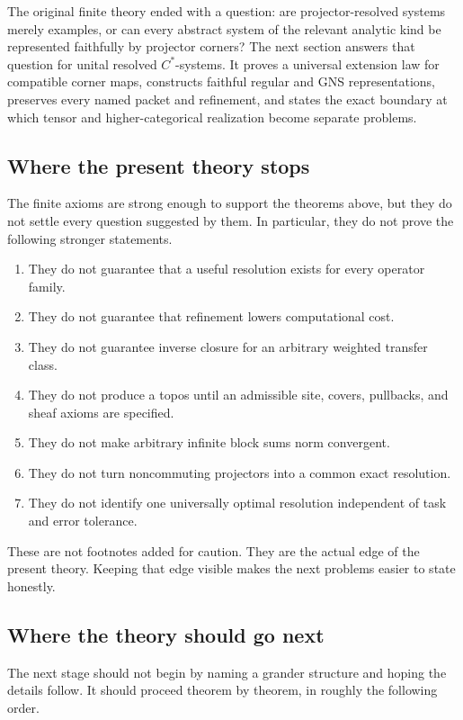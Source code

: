 \documentclass[11pt]{article}
\theoremstyle{definition}
\theoremstyle{remark}
\begin{document}
The original finite theory ended with a question: are projector-resolved systems merely examples, or can every abstract system of the relevant analytic kind be represented faithfully by projector corners?  The next section answers that question for unital resolved $C^*$-systems.  It proves a universal extension law for compatible corner maps, constructs faithful regular and GNS representations, preserves every named packet and refinement, and states the exact boundary at which tensor and higher-categorical realization become separate problems.

\subsection{Where the present theory stops}

The finite axioms are strong enough to support the theorems above, but they do not settle every question suggested by them.  In particular, they do not prove the following stronger statements.

\begin{enumerate}[label=\arabic*.]
\item They do not guarantee that a useful resolution exists for every operator family.
\item They do not guarantee that refinement lowers computational cost.
\item They do not guarantee inverse closure for an arbitrary weighted transfer class.
\item They do not produce a topos until an admissible site, covers, pullbacks, and sheaf axioms are specified.
\item They do not make arbitrary infinite block sums norm convergent.
\item They do not turn noncommuting projectors into a common exact resolution.
\item They do not identify one universally optimal resolution independent of task and error tolerance.
\end{enumerate}

These are not footnotes added for caution.  They are the actual edge of the present theory.  Keeping that edge visible makes the next problems easier to state honestly.

\subsection{Where the theory should go next}

The next stage should not begin by naming a grander structure and hoping the details follow.  It should proceed theorem by theorem, in roughly the following order.
\end{document}
